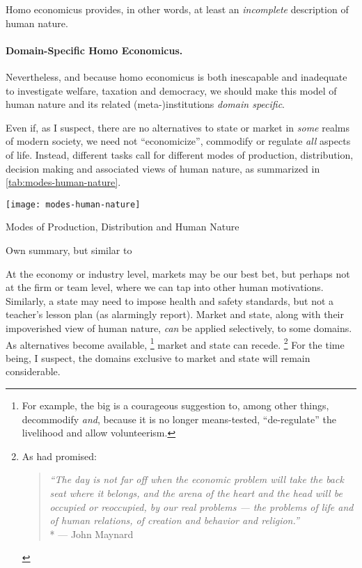 {Homo economicus provides, in other words, at least an \emph{incomplete} description of human nature.

\paragraph{Domain-Specific Homo Economicus.}
Nevertheless, and because homo economicus is both inescapable and inadequate to investigate welfare, taxation and democracy, we should make this model of human nature and its related (meta-)institutions \emph{domain specific}.

Even if, as I suspect, there are no alternatives to state or market in \emph{some} realms of modern society, we need not ``economicize'', commodify or regulate \emph{all} aspects of life.
Instead, different tasks call for different modes of production, distribution, decision making and associated views of human nature, as summarized in \autoref{tab:modes-human-nature}.

\begin{table}[htbp]
	\centering
	\texttt{[image: modes-human-nature]}
	\caption{Modes of Production, Distribution and Human Nature}
	\label{tab:modes-human-nature}
	\scriptsize{Own summary, but similar to \citealt[52f.]{Schmitter1985}}
\end{table}%

At the economy or industry level, markets may be our best bet, but perhaps not at the firm or team level, where we can tap into other human motivations.
Similarly, a state may need to impose health and safety standards, but not a teacher's lesson plan (as \citeauthor{Schwartz2010} alarmingly report).
Market and state, along with their impoverished view of human nature, \emph{can} be applied selectively, to some domains.
As alternatives become available,
\footnote{
	For example, the \gls{big} is a courageous suggestion to, among other things, decommodify \emph{and}, because it is no longer means-tested, ``de-regulate'' the livelihood \citep[for example,][]{Offe2009} and allow volunteerism.
}
market and state can recede.
\footnote{
	As \citeauthor{Keynes} had promised:
	\begin{quote}
		\emph{``The day is not far off when the economic problem will take the back seat where it belongs, and the arena of the heart and the head will be occupied or reoccupied, by our real problems --- the problems of life and of human relations, of creation and behavior and religion.''}
		\\*
		--- John Maynard \cite{Keynes}
	\end{quote}
}
For the time being, I suspect, the domains exclusive to market and state will remain considerable.

}
